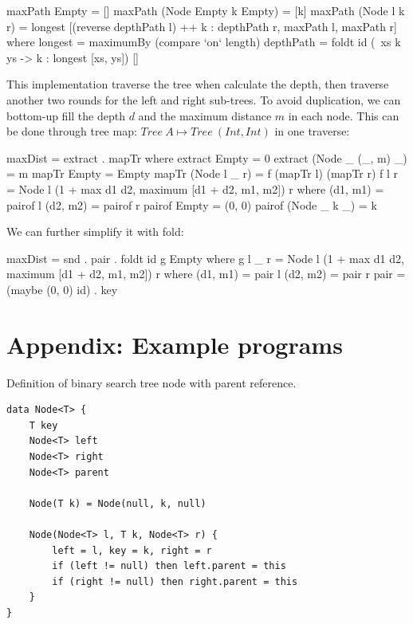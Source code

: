 \documentclass[b5paper]{article}
\begin{document}
\begin{Answer}[ref={ex:bst-delete}]
{\begin{Haskell}
maxPath Empty = []
maxPath (Node Empty k Empty) = [k]
maxPath (Node l k r) = longest [(reverse depthPath l) ++ k : depthPath r,
                         maxPath l, maxPath r] where
  longest = maximumBy (compare `on` length)
  depthPath = foldt id (\ xs k ys -> k : longest [xs, ys]) []
\end{Haskell}

This implementation traverse the tree when calculate the depth, then traverse another two rounds for the left and right sub-trees. To avoid duplication, we can bottom-up fill the depth $d$ and the maximum distance $m$ in each node. This can be done through tree map: $Tree\ A \mapsto Tree\ (Int, Int)$ in one traverse:

\begin{Haskell}
maxDist = extract . mapTr where
  extract Empty = 0
  extract (Node _ (_, m) _) = m
  mapTr Empty = Empty
  mapTr (Node l _ r) = f (mapTr l) (mapTr r)
  f l r = Node l (1 + max d1 d2, maximum [d1 + d2, m1, m2]) r where
    (d1, m1) = pairof l
    (d2, m2) = pairof r
    pairof Empty = (0, 0)
    pairof (Node _ k _) = k
\end{Haskell}

We can further simplify it with fold:

\begin{Haskell}
maxDist = snd . pair . foldt id g Empty where
  g l _ r = Node l (1 + max d1 d2, maximum [d1 + d2, m1, m2]) r where
    (d1, m1) = pair l
    (d2, m2) = pair r
  pair = (maybe (0, 0) id) . key
\end{Haskell}
}
\end{Answer}

\section{Appendix: Example programs}

Definition of binary search tree node with parent reference.

\lstset{language=Bourbaki, frame=single}
\begin{lstlisting}
data Node<T> {
    T key
    Node<T> left
    Node<T> right
    Node<T> parent

    Node(T k) = Node(null, k, null)

    Node(Node<T> l, T k, Node<T> r) {
        left = l, key = k, right = r
        if (left != null) then left.parent = this
        if (right != null) then right.parent = this
    }
}
\end{lstlisting}
\end{document}
